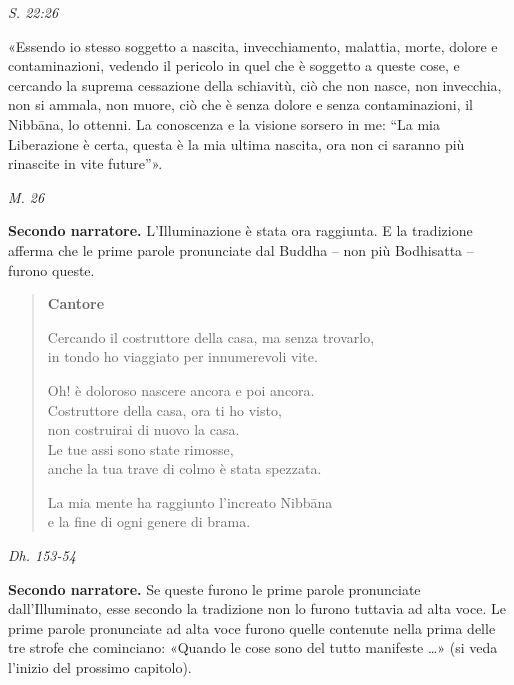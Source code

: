 \emph{S. 22:26}


«Essendo io stesso soggetto a nascita, invecchiamento, malattia, morte,
dolore e contaminazioni, vedendo il pericolo in quel che è soggetto a
queste cose, e cercando la suprema cessazione della schiavitù, ciò che
non nasce, non invecchia, non si ammala, non muore, ciò che è senza
dolore e senza contaminazioni, il Nibbāna, lo ottenni. La conoscenza e
la visione sorsero in me: “La mia Liberazione è certa, questa è la mia
ultima nascita, ora non ci saranno più rinascite in vite future”».


\emph{M. 26}


\textbf{Secondo narratore.} L’Illuminazione è stata ora raggiunta. E la
tradizione afferma che le prime parole pronunciate dal Buddha – non più
Bodhisatta – furono queste.


\begin{quotation}
\textbf{Cantore}


Cercando il costruttore della casa, ma senza trovarlo, \\
in tondo ho viaggiato per innumerevoli vite.


Oh! è doloroso nascere ancora e poi ancora. \\
Costruttore della casa, ora ti ho visto, \\
non costruirai di nuovo la casa. \\
Le tue assi sono state rimosse, \\
anche la tua trave di colmo è stata spezzata.


La mia mente ha raggiunto l’increato Nibbāna \\
e la fine di ogni genere di brama.
\end{quotation}

\emph{Dh. 153-54}


\textbf{Secondo narratore.} Se queste furono le prime parole pronunciate
dall’Illuminato, esse secondo la tradizione non lo furono tuttavia ad
alta voce. Le prime parole pronunciate ad alta voce furono quelle
contenute nella prima delle tre strofe che cominciano: «Quando le cose
sono del tutto manifeste …​» (si veda l’inizio del prossimo capitolo).


